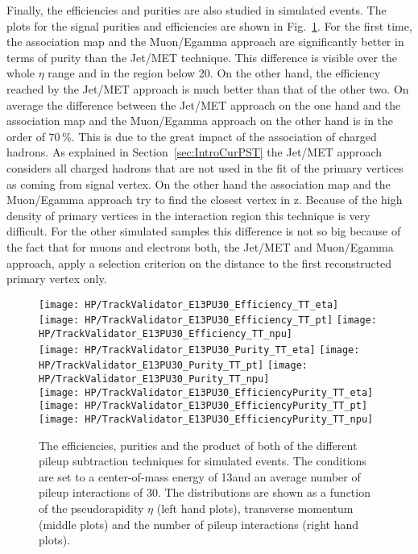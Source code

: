 Finally, the efficiencies and purities are also studied in simulated \ttbar events. The plots for the signal purities and efficiencies are shown in Fig.~\ref{plot:HPUTAE13PU30TTComp}. For the first time, the association map and the Muon/Egamma approach are significantly better in terms of purity  than the Jet/MET technique. This difference is visible over the whole $\eta$ range and in the \pt{} region below 20\GeV{}. On the other hand, the efficiency reached by the Jet/MET approach is much better than that of the other two. On average the difference between the Jet/MET approach on the one hand and the association map and the Muon/Egamma approach on the other hand is in the order of $70\,\%$. This is due to the great impact of the association of charged hadrons. As explained in Section~\ref{sec:IntroCurPST} the Jet/MET approach considers all charged hadrons that are not used in the fit of the primary vertices as coming from signal vertex. On the other hand the association map and the Muon/Egamma approach try to find the closest vertex in z. Because of the high density of primary vertices in the interaction region this technique is very difficult. For the other simulated samples this difference is not so big because of the fact that for muons and electrons both, the Jet/MET and Muon/Egamma approach, apply a selection criterion on the distance to the first reconstructed primary vertex only.

\begin{figure}[!t]
  \centering
  \texttt{[image: HP/TrackValidator\_E13PU30\_Efficiency\_TT\_eta]}
  \texttt{[image: HP/TrackValidator\_E13PU30\_Efficiency\_TT\_pt]}
  \texttt{[image: HP/TrackValidator\_E13PU30\_Efficiency\_TT\_npu]}
   \\
  \texttt{[image: HP/TrackValidator\_E13PU30\_Purity\_TT\_eta]}
  \texttt{[image: HP/TrackValidator\_E13PU30\_Purity\_TT\_pt]}
  \texttt{[image: HP/TrackValidator\_E13PU30\_Purity\_TT\_npu]}
   \\
  \texttt{[image: HP/TrackValidator\_E13PU30\_EfficiencyPurity\_TT\_eta]}
  \texttt{[image: HP/TrackValidator\_E13PU30\_EfficiencyPurity\_TT\_pt]}
  \texttt{[image: HP/TrackValidator\_E13PU30\_EfficiencyPurity\_TT\_npu]}
  \caption[Purities, efficiencies and their product of the different pileup subtraction techniques based on simulated \ttbar events with 13\TeV and $\left<PU\right>=30$]{The efficiencies, purities and the product of both of the different pileup subtraction techniques for simulated \ttbar events. The conditions are set to a center-of-mass energy of 13\TeV and an average number of pileup interactions of 30. The distributions are shown as a function of the pseudorapidity $\eta$ (left hand plots), transverse momentum (middle plots) and the number of pileup interactions (right hand plots). \label{plot:HPUTAE13PU30TTComp}}
\end{figure}

